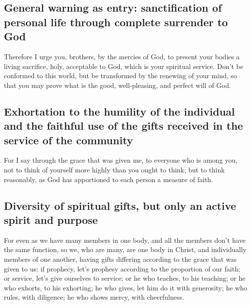 \hypertarget{general-warning-as-entry-sanctification-of-personal-life-through-complete-surrender-to-god}{%
\subsection{General warning as entry: sanctification of personal life
through complete surrender to
God}\label{general-warning-as-entry-sanctification-of-personal-life-through-complete-surrender-to-god}}

 Therefore I urge you, brothers, by the mercies of God, to
present your bodies a living sacrifice, holy, acceptable to God, which
is your spiritual service.  Don't be conformed to this
world, but be transformed by the renewing of your mind, so that you may
prove what is the good, well-pleasing, and perfect will of God.

\hypertarget{exhortation-to-the-humility-of-the-individual-and-the-faithful-use-of-the-gifts-received-in-the-service-of-the-community}{%
\subsection{Exhortation to the humility of the individual and the
faithful use of the gifts received in the service of the
community}\label{exhortation-to-the-humility-of-the-individual-and-the-faithful-use-of-the-gifts-received-in-the-service-of-the-community}}

 For I say through the grace that was given me, to
everyone who is among you, not to think of yourself more highly than you
ought to think; but to think reasonably, as God has apportioned to each
person a measure of faith.

\hypertarget{diversity-of-spiritual-gifts-but-only-an-active-spirit-and-purpose}{%
\subsection{Diversity of spiritual gifts, but only an active spirit and
purpose}\label{diversity-of-spiritual-gifts-but-only-an-active-spirit-and-purpose}}

 For even as we have many members in one body, and all the
members don't have the same function,  so we, who are
many, are one body in Christ, and individually members of one another,
 having gifts differing according to the grace that was
given to us: if prophecy, let's prophesy according to the proportion of
our faith;  or service, let's give ourselves to service;
or he who teaches, to his teaching;  or he who exhorts, to
his exhorting; he who gives, let him do it with generosity; he who
rules, with diligence; he who shows mercy, with cheerfulness.

